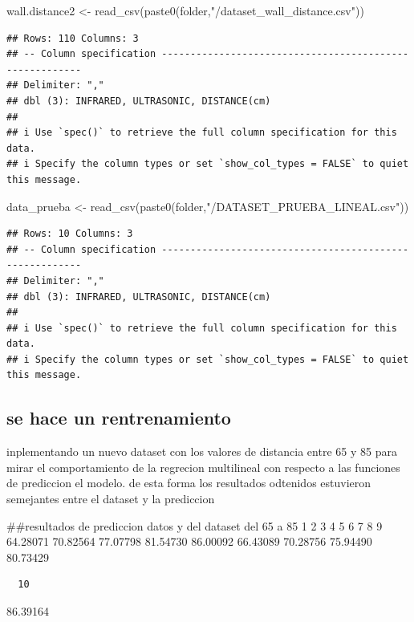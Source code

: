 \documentclass[
]{article}
\newenvironment{Shaded}{\begin{snugshade}}{\end{snugshade}}
\newcommand{\FunctionTok}[1]{\textcolor[rgb]{0.00,0.00,0.00}{#1}}
\newcommand{\NormalTok}[1]{#1}
\newcommand{\OtherTok}[1]{\textcolor[rgb]{0.56,0.35,0.01}{#1}}
\newcommand{\StringTok}[1]{\textcolor[rgb]{0.31,0.60,0.02}{#1}}
\begin{document}
\begin{Shaded}
\begin{Highlighting}[]
\NormalTok{wall.distance2 }\OtherTok{\textless{}{-}} \FunctionTok{read\_csv}\NormalTok{(}\FunctionTok{paste0}\NormalTok{(folder,}\StringTok{"/dataset\_wall\_distance.csv"}\NormalTok{))}
\end{Highlighting}
\end{Shaded}

\begin{verbatim}
## Rows: 110 Columns: 3
## -- Column specification --------------------------------------------------------
## Delimiter: ","
## dbl (3): INFRARED, ULTRASONIC, DISTANCE(cm)
## 
## i Use `spec()` to retrieve the full column specification for this data.
## i Specify the column types or set `show_col_types = FALSE` to quiet this message.
\end{verbatim}

\begin{Shaded}
\begin{Highlighting}[]
\NormalTok{data\_prueba }\OtherTok{\textless{}{-}} \FunctionTok{read\_csv}\NormalTok{(}\FunctionTok{paste0}\NormalTok{(folder,}\StringTok{"/DATASET\_PRUEBA\_LINEAL.csv"}\NormalTok{))}
\end{Highlighting}
\end{Shaded}

\begin{verbatim}
## Rows: 10 Columns: 3
## -- Column specification --------------------------------------------------------
## Delimiter: ","
## dbl (3): INFRARED, ULTRASONIC, DISTANCE(cm)
## 
## i Use `spec()` to retrieve the full column specification for this data.
## i Specify the column types or set `show_col_types = FALSE` to quiet this message.
\end{verbatim}

\hypertarget{se-hace-un-rentrenamiento}{%
\subsection{se hace un rentrenamiento}\label{se-hace-un-rentrenamiento}}

inplementando un nuevo dataset con los valores de distancia entre 65 y
85 para mirar el comportamiento de la regrecion multilineal con respecto
a las funciones de prediccion el modelo. de esta forma los resultados
odtenidos estuvieron semejantes entre el dataset y la prediccion

\#\#resultados de prediccion datos y del dataset del 65 a 85 1 2 3 4 5 6
7 8 9 64.28071 70.82564 77.07798 81.54730 86.00092 66.43089 70.28756
75.94490 80.73429

\begin{verbatim}
  10 
\end{verbatim}

86.39164
\end{document}
